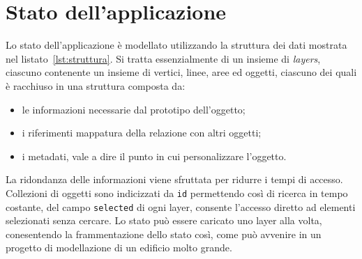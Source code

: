 \section{Stato dell'applicazione}
\label{sec:chapter_2_section_4}

Lo stato dell'applicazione è modellato utilizzando la struttura dei dati mostrata nel listato~\ref{lst:struttura}.
Si tratta essenzialmente di un insieme di \emph{layers}, ciascuno contenente un insieme di vertici, linee, aree
ed oggetti, ciascuno dei quali è racchiuso in una struttura composta da:
\begin{itemize}
\item le informazioni necessarie dal prototipo dell'oggetto;
\item i riferimenti mappatura della relazione con altri oggetti;
\item i metadati, vale a dire il punto in cui personalizzare l'oggetto.
\end{itemize}
La ridondanza delle informazioni viene sfruttata per ridurre i tempi di accesso. Collezioni di oggetti
sono indicizzati da \texttt{id} permettendo così di ricerca in tempo costante, del
campo \texttt{selected} di ogni layer, consente l'accesso diretto ad elementi selezionati senza cercare.
Lo stato può essere caricato uno layer alla volta, conesentendo la frammentazione dello stato così,
come può avvenire in un progetto di modellazione di un edificio molto grande.
\newpage



